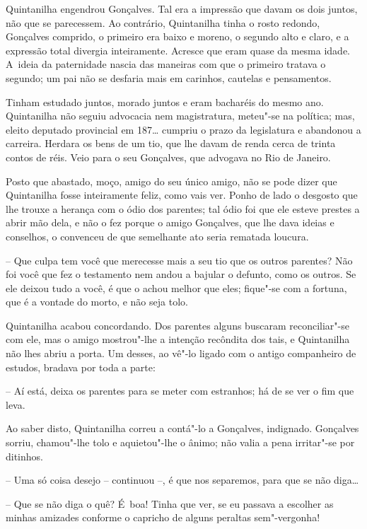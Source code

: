 Quintanilha engendrou Gonçalves. Tal era a impressão que davam os dois
juntos, não que se parecessem. Ao contrário, Quintanilha tinha o rosto
redondo, Gonçalves comprido, o primeiro era baixo e moreno, o segundo
alto e claro, e a expressão total divergia inteiramente. Acresce que
eram quase da mesma idade. A~ideia da paternidade nascia das maneiras
com que o primeiro tratava o segundo; um pai não se desfaria mais em
carinhos, cautelas e pensamentos.

Tinham estudado juntos, morado juntos e eram bacharéis do mesmo ano.
Quintanilha não seguiu advocacia nem magistratura, meteu"-se na política;
mas, eleito deputado provincial em 187\ldots{} cumpriu o prazo da legislatura
e abandonou a carreira. Herdara os bens de um tio, que lhe davam de
renda cerca de trinta contos de réis. Veio para o seu Gonçalves, que
advogava no Rio de Janeiro.

Posto que abastado, moço, amigo do seu único amigo, não se pode dizer
que Quintanilha fosse inteiramente feliz, como vais ver. Ponho de lado o
desgosto que lhe trouxe a herança com o ódio dos parentes; tal ódio foi
que ele esteve prestes a abrir mão dela, e não o fez porque o amigo
Gonçalves, que lhe dava ideias e conselhos, o convenceu de que
semelhante ato seria rematada loucura.

-- Que culpa tem você que merecesse mais a seu tio que os outros
parentes? Não foi você que fez o testamento nem andou a bajular o
defunto, como os outros. Se ele deixou tudo a você, é que o achou melhor
que eles; fique"-se com a fortuna, que é a vontade do morto, e não seja
tolo.

Quintanilha acabou concordando. Dos parentes alguns buscaram
reconciliar"-se com ele, mas o amigo mostrou"-lhe a intenção recôndita dos
tais, e Quintanilha não lhes abriu a porta. Um desses, ao vê"-lo ligado
com o antigo companheiro de estudos, bradava por toda a parte:

-- Aí está, deixa os parentes para se meter com estranhos; há de se ver
o fim que leva.

Ao saber disto, Quintanilha correu a contá"-lo a Gonçalves, indignado.
Gonçalves sorriu, chamou"-lhe tolo e aquietou"-lhe o ânimo; não valia a
pena irritar"-se por ditinhos.

-- Uma só coisa desejo -- continuou --, é que nos separemos, para que se
não diga\ldots{}

-- Que se não diga o quê? É~boa! Tinha que ver, se eu passava a escolher
as minhas amizades conforme o capricho de alguns peraltas sem"-vergonha!

